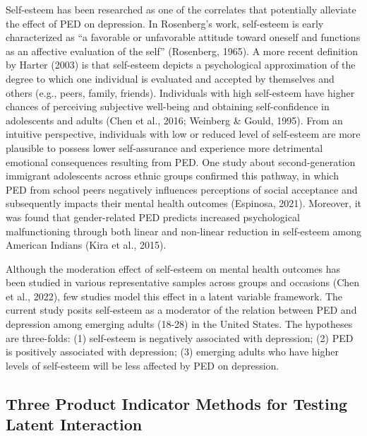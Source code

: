 \documentclass[
  man]{apa7}
\begin{document}
Self-esteem has been researched as one of the correlates that potentially alleviate the effect of PED on depression. In Rosenberg's work, self-esteem is early characterized as ``a favorable or unfavorable attitude toward oneself and functions as an affective evaluation of the self'' (Rosenberg, 1965). A more recent definition by Harter (2003) is that self-esteem depicts a psychological approximation of the degree to which one individual is evaluated and accepted by themselves and others (e.g., peers, family, friends). Individuals with high self-esteem have higher chances of perceiving subjective well-being and obtaining self-confidence in adolescents and adults (Chen et al., 2016; Weinberg \& Gould, 1995). From an intuitive perspective, individuals with low or reduced level of self-esteem are more plausible to possess lower self-assurance and experience more detrimental emotional consequences resulting from PED. One study about second-generation immigrant adolescents across ethnic groups confirmed this pathway, in which PED from school peers negatively influences perceptions of social acceptance and subsequently impacts their mental health outcomes (Espinosa, 2021). Moreover, it was found that gender-related PED predicts increased psychological malfunctioning through both linear and non-linear reduction in self-esteem among American Indians (Kira et al., 2015).

Although the moderation effect of self-esteem on mental health outcomes has been studied in various representative samples across groups and occasions (Chen et al., 2022), few studies model this effect in a latent variable framework. The current study posits self-esteem as a moderator of the relation between PED and depression among emerging adults (18-28) in the United States. The hypotheses are three-folds: (1) self-esteem is negatively associated with depression; (2) PED is positively associated with depression; (3) emerging adults who have higher levels of self-esteem will be less affected by PED on depression.

\hypertarget{three-product-indicator-methods-for-testing-latent-interaction}{%
\subsection{Three Product Indicator Methods for Testing Latent Interaction}\label{three-product-indicator-methods-for-testing-latent-interaction}}
\end{document}

